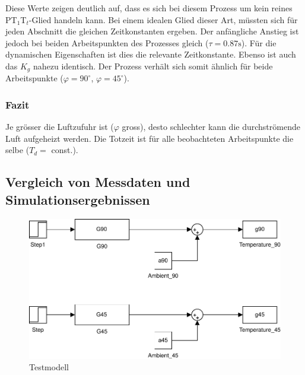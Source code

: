Diese Werte zeigen deutlich auf, dass es sich bei diesem Prozess um kein
reines PT$_1$T$_t$-Glied handeln kann. Bei einem idealen Glied dieser Art,
müssten sich für jeden Abschnitt die gleichen Zeitkonstanten ergeben.
Der anfängliche Anstieg ist jedoch bei beiden Arbeitspunkten des Prozesses
gleich ($\tau = 0.87\si{\second}$). Für die dynamischen Eigenschaften ist
dies die relevante Zeitkonstante. Ebenso ist auch das $K_g$ nahezu identisch.
Der Prozess verhält sich somit ähnlich für beide Arbeitspunkte
($\varphi = 90^\circ$, $\varphi = 45^\circ$).

\subsubsection{Fazit}
Je grösser die Luftzufuhr ist ($\varphi$ gross), desto schlechter kann die
durchströmende Luft aufgeheizt werden. Die Totzeit ist für alle beobachteten
Arbeitspunkte die selbe ($T_d =$ const.).


\subsection{Vergleich von Messdaten und Simulationsergebnissen}

\begin{figure}[h!]
    \centering
    \includegraphics[scale=0.8]{04/model.pdf}
    \caption{Testmodell}
\end{figure}

